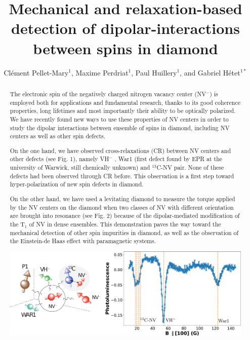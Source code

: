\documentclass[aps,twocolumn,showpacs]{revtex4-1}
\begin{document}
\title{Mechanical and relaxation-based detection of dipolar-interactions between spins in diamond}

\author{Clément Pellet-Mary$^1$, Maxime Perdriat$^1$, Paul Huillery$^1$, and Gabriel Hétet$^{1*}$}


\begin{abstract}
\normalsize
The electronic spin of the negatively charged nitrogen vacancy center (NV$^-$) is employed both for applications and fundamental research, thanks to its good coherence properties, long lifetimes and most importantly their ability to be optically polarized.
We have recently found new ways to use these properties of NV centers in order to study the dipolar interactions between ensemble of spins in diamond, including NV centers as well as other spin defects. 

On the one hand, we have observed cross-relaxations (CR) between NV centers and other defects (see Fig. 1), namely VH$^-$ \cite{VH}, War1 (first defect found by EPR at the university of Warwick, still chemically unknown) and $^{13}$C-NV pair. None of these defects had been observed through CR before. This observation is a first step toward hyper-polarization of new spin defects in diamond.

On the other hand, we have used a levitating diamond \cite{nature} to measure the torque applied by the NV centers on the diamond when two classes of NV with different orientation are brought into resonance (see Fig. 2) because of the dipolar-mediated modification of the T$_1$ of NV in dense ensembles\cite{Lukin}. This demonstration paves the way toward the mechanical detection of other spin impurities in diamond, as well as the observation of the Einstein-de Haas effect with paramagnetic systems\cite{Meriles}.

\begin{center}
\includegraphics[scale=.25]{CR_total}
\end{center}


\end{abstract}
\end{document}
